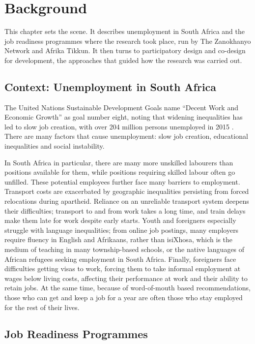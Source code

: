 \chapter{Background}
\label{sec:jr-programmes}
\begin{chapterintro}
This chapter sets the scene. It describes unemployment in South Africa and the job readiness programmes where the research took place, run by The Zanokhanyo Network and Afrika Tikkun. It then turns to participatory design and co-design for development, the approaches that guided how the research was carried out.
\end{chapterintro}

\section{Context: Unemployment in South Africa}

The United Nations Sustainable Development Goals name ``Decent Work and Economic
Growth'' as goal number eight, noting that widening inequalities has led to slow job
creation, with over 204 million persons unemployed in 2015 \cite{unsdg8mirror}. There are many factors that
cause unemployment: slow job creation, educational inequalities and social instability.

In South Africa in particular, there are many more unskilled labourers than positions
available for them, while positions requiring skilled labour often go unfilled. These
potential employees further face many barriers to employment. Transport costs are
exacerbated by geographic inequalities persisting from forced relocations during apartheid.
Reliance on an unreliable transport system deepens their difficulties; transport to and
from work takes a long time, and train delays make them late for work despite early
starts. Youth and foreigners especially struggle with language inequalities; from online job
postings, many employers require fluency in English and Afrikaans, rather than isiXhosa,
which is the medium of teaching in many township-based schools, or the native languages
of African refugees seeking employment in South Africa. Finally, foreigners face difficulties
getting visas to work, forcing them to take informal employment at wages below living
costs, affecting their performance at work and their ability to retain jobs. At the same
time, because of word-of-mouth based recommendations, those who can get and keep a
job for a year are often those who stay employed for the rest of their lives.

\section{Job Readiness Programmes}

